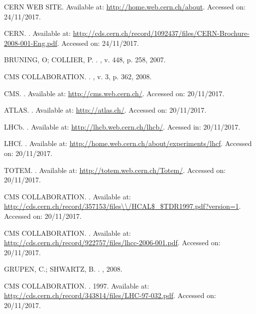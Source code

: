\begin{thebibliography}{}
CERN WEB SITE. 
Available at: \url{http://home.web.cern.ch/about}.
Accessed on: 24/11/2017.

CERN. 
.
Available at: \url{http://cds.cern.ch/record/1092437/files/CERN-Brochure-2008-001-Eng.pdf}.
Accessed on: 24/11/2017.

BRUNING, O; COLLIER, P.
.
, v. 448, p. 258, 2007.

CMS COLLABORATION.
.
, v. 3, p. 362, 2008.

CMS.
.
Available at: \url{http://cms.web.cern.ch/}.
Accessed on: 20/11/2017.

ATLAS.
.
Available at: \url{http://atlas.ch/}.
Accessed on: 20/11/2017.

LHCb.
.
Available at: \url{http://lhcb.web.cern.ch/lhcb/}.
Acessed in: 20/11/2017.

LHCf.
.
Available at: \url{http://home.web.cern.ch/about/experiments/lhcf}.
Accessed on: 20/11/2017.

TOTEM.
.
Available at: \url{http://totem.web.cern.ch/Totem/}.
Accessed on: 20/11/2017.

CMS COLLABORATION.
.
Available at: \url{http://cds.cern.ch/record/357153/files\\/HCAL$\_$TDR1997.pdf?version=1}.
Accessed on: 20/11/2017.

CMS COLLABORATION.
.
Available at: \url{http://cds.cern.ch/record/922757/files/lhcc-2006-001.pdf}.
Accessed on: 20/11/2017.

GRUPEN, C.; SHWARTZ, B.
.
, 2008.

CMS COLLABORATION.
. 1997.
Available at: \url{http://cds.cern.ch/record/343814/files/LHC-97-032.pdf}.
Accessed on: 20/11/2017.


\end{thebibliography}
